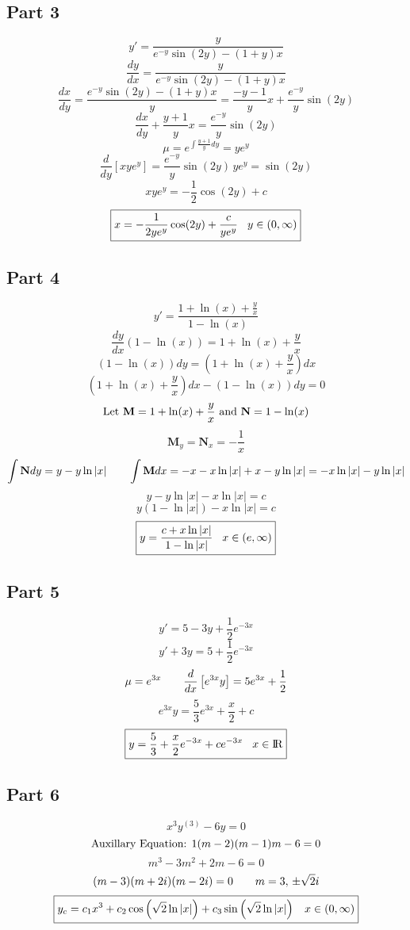 \documentclass{article}
\begin{document}
\subsection*{Part 3}
\[y'=\frac{y}{e^{-y}\sin(2y)-(1+y)x}\]
\[\frac{dy}{dx}=\frac{y}{e^{-y}\sin(2y)-(1+y)x}\]
\[\frac{dx}{dy}=\frac{e^{-y}\sin(2y)-(1+y)x}{y}=\frac{-y-1}{y}x+\frac{e^{-y}}{y}\sin(2y)\]
\[\frac{dx}{dy}+\frac{y+1}{y}x=\frac{e^{-y}}{y}\sin(2y)\]
\[\mu=e^{\int\frac{y+1}{y}dy}=ye^y\]
\[\frac{d}{dy}\left[xye^y\right]=\frac{e^{-y}}{y}\sin(2y)\,ye^y=\sin(2y)\]
\[xye^y=-\frac{1}{2}\cos(2y)+c\]
\[\boxed{x=-\frac{1}{2ye^y}\cos(2y)+\frac{c}{ye^y}\hspace{3 mm}y\in(0,\infty)}\]
\subsection*{Part 4}
\[y'=\frac{1+\ln(x)+\frac{y}{x}}{1-\ln(x)}\]
\[\frac{dy}{dx}(1-\ln(x))=1+\ln(x)+\frac{y}{x}\]
\[(1-\ln(x))dy=\left(1+\ln(x)+\frac{y}{x}\right)dx\]
\[\left(1+\ln(x)+\frac{y}{x}\right)dx-(1-\ln(x))dy=0\]
\[\textnormal{Let } \textbf{M}=1+\ln(x)+\frac{y}{x} \textnormal{ and } \textbf{N}=1-\ln(x)\]
\[\textbf{M}_y=\textbf{N}_x=-\frac{1}{x}\]
\[\int\textbf{N}dy=y-y\ln|x|\hspace{7 mm}\int\textbf{M}dx=-x-x\ln|x|+x-y\ln|x|=-x\ln|x|-y\ln|x|\]
\[y-y\ln|x|-x\ln|x|=c\]
\[y(1-\ln|x|)-x\ln|x|=c\]
\[\boxed{y=\frac{c+x\ln|x|}{1-\ln|x|}\hspace{3 mm}x\in(e,\infty)}\]
\subsection*{Part 5}
\[y'=5-3y+\frac{1}{2}e^{-3x}\]
\[y'+3y=5+\frac{1}{2}e^{-3x}\]
\[\mu=e^{3x}\hspace{7 mm}\frac{d}{dx}\left[e^{3x}y\right]=5e^{3x}+\frac{1}{2}\]
\[e^{3x}y=\frac{5}{3}e^{3x}+\frac{x}{2}+c\]
\[\boxed{y=\frac{5}{3}+\frac{x}{2}e^{-3x}+ce^{-3x}\hspace{3 mm}x\in{\rm I\!R}}\]
\subsection*{Part 6}
\[x^3y^{(3)}-6y=0\]
\[\textnormal{Auxillary Equation: }1(m-2)(m-1)m-6=0\]
\[m^3-3m^2+2m-6=0\]
\[(m-3)(m+2i)(m-2i)=0\hspace{7 mm}m=3,\,\pm\sqrt{2}i\]
\[\boxed{y_c=c_1x^3+c_2\cos\left(\sqrt{2}\ln|x|\right)+c_3\sin\left(\sqrt{2}\ln|x|\right)\hspace{3 mm}x\in(0,\infty)}\]
\newpage
\end{document}
